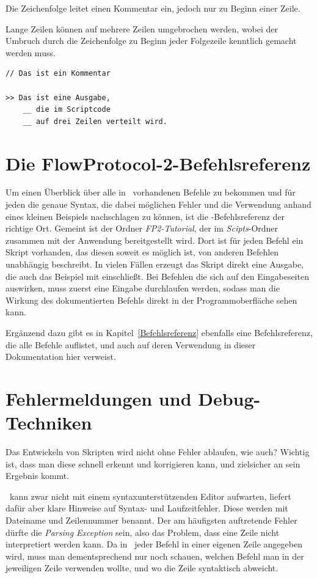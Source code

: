 Die Zeichenfolge \cidxfrag{//} leitet einen Kommentar ein, jedoch nur zu Beginn einer Zeile.

Lange Zeilen können auf mehrere Zeilen umgebrochen werden, wobei der Umbruch durch die Zeichenfolge \cidxfrag{\_\_} zu Beginn jeder Folgezeile kenntlich gemacht werden muss.

\begin{verbatim}
// Das ist ein Kommentar

>> Das ist eine Ausgabe,
    __ die im Scriptcode
    __ auf drei Zeilen verteilt wird.
\end{verbatim}

\section{Die FlowProtocol-2-Befehlsreferenz}
Um einen Überblick über alle in \FPZ\ vorhandenen Befehle zu bekommen und für jeden die genaue Syntax, die dabei möglichen Fehler und die Verwendung anhand eines kleinen Beispiels nachschlagen zu können, ist die \FPZb-Befehlsreferenz der richtige Ort. Gemeint ist der Ordner \emph{FP2-Tutorial}, der im \emph{Scipts}-Ordner zusammen mit der Anwendung bereitgestellt wird. Dort ist für jeden Befehl ein Skript vorhanden, das diesen soweit es möglich ist, von anderen Befehlen unabhängig beschreibt. In vielen Fällen erzeugt das Skript direkt eine Ausgabe, die auch das Beispiel mit einschließt. Bei Befehlen die sich auf den Eingabeseiten auswirken, muss zuerst eine Eingabe durchlaufen werden, sodass man die Wirkung des dokumentierten Befehls direkt in der Programmoberfläche sehen kann.

Ergänzend dazu gibt es in Kapitel~\ref{Befehlsreferenz} ebenfalls eine Befehlsreferenz, die alle Befehle auf\-listet, und auch auf deren Verwendung in dieser Dokumentation hier verweist.

\section{Fehlermeldungen und Debug-Techniken}
Das Entwickeln von Skripten wird nicht ohne Fehler ablaufen, wie auch? Wichtig ist, dass man diese schnell erkennt und korrigieren kann, und zielsicher an sein Ergebnis kommt.

\FPZ\ kann zwar nicht mit einem syntaxunterstützenden Editor aufwarten, liefert dafür aber klare Hinweise auf Syntax- und Laufzeitfehler. Diese werden mit Dateiname und Zeilennummer benannt. Der am häufigsten auftretende Fehler dürfte die \emph{Parsing Exception} sein, also das Problem, dass eine Zeile nicht interpretiert werden kann. Da in \FPZ\ jeder Befehl in einer eigenen Zeile angegeben wird, muss man dementsprechend nur noch schauen, welchen Befehl man in der jeweiligen Zeile verwenden wollte, und wo die Zeile syntaktisch abweicht.

